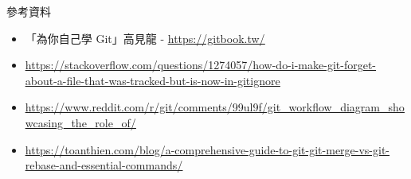 \documentclass[xetex, unicode, 10pt, aspectratio=169]{beamer}
\begin{document}
\begin{frame}{參考資料}
    \begin{itemize}
        \item 「為你自己學 Git」高見龍 -
            \href{https://gitbook.tw/}{\ul{https://gitbook.tw/}}
        \item
            \href{https://stackoverflow.com/questions/1274057/how-do-i-make-git-forget-about-a-file-that-was-tracked-but-is-now-in-gitignore}{\ul{https://stackoverflow.com/questions/1274057/how-do-i-make-git-forget-about-a-file-that-was-tracked-but-is-now-in-gitignore}}
        \item
            \href{https://www.reddit.com/r/git/comments/99ul9f/git_workflow_diagram_showcasing_the_role_of/}{\small
            \ul{https://www.reddit.com/r/git/comments/99ul9f/git\_workflow\_diagram\_showcasing\_the\_role\_of/}}
        \item
            \href{https://toanthien.com/blog/a-comprehensive-guide-to-git-git-merge-vs-git-rebase-and-essential-commands/}{\ul{https://toanthien.com/blog/a-comprehensive-guide-to-git-git-merge-vs-git-rebase-and-essential-commands/}}
    \end{itemize}
\end{frame}
\end{document}
